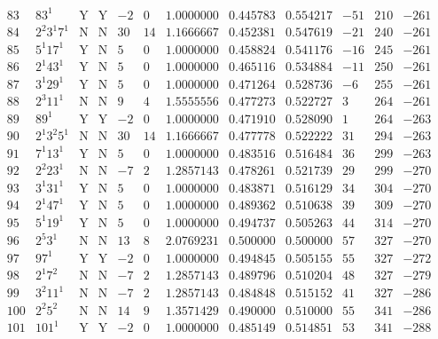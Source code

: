 \documentclass[11pt,reqno,a4letter]{article}
\numberwithin{figure}{section}
\numberwithin{table}{section}
\theoremstyle{plain}
\numberwithin{theorem}{section}
\theoremstyle{definition}
\begin{document}
\begin{table}[h!]
\begin{equation*}
{\begin{array}{cc|cc|ccc|cc|ccc}
 83 & 83^1 & \text{Y} & \text{Y} & -2 & 0 & 1.0000000 & 0.445783 & 0.554217 & -51 & 210 & -261 \\
 84 & 2^2 3^1 7^1 & \text{N} & \text{N} & 30 & 14 & 1.1666667 & 0.452381 & 0.547619 & -21 & 240 & -261 \\
 85 & 5^1 17^1 & \text{Y} & \text{N} & 5 & 0 & 1.0000000 & 0.458824 & 0.541176 & -16 & 245 & -261 \\
 86 & 2^1 43^1 & \text{Y} & \text{N} & 5 & 0 & 1.0000000 & 0.465116 & 0.534884 & -11 & 250 & -261 \\
 87 & 3^1 29^1 & \text{Y} & \text{N} & 5 & 0 & 1.0000000 & 0.471264 & 0.528736 & -6 & 255 & -261 \\
 88 & 2^3 11^1 & \text{N} & \text{N} & 9 & 4 & 1.5555556 & 0.477273 & 0.522727 & 3 & 264 & -261 \\
 89 & 89^1 & \text{Y} & \text{Y} & -2 & 0 & 1.0000000 & 0.471910 & 0.528090 & 1 & 264 & -263 \\
 90 & 2^1 3^2 5^1 & \text{N} & \text{N} & 30 & 14 & 1.1666667 & 0.477778 & 0.522222 & 31 & 294 & -263 \\
 91 & 7^1 13^1 & \text{Y} & \text{N} & 5 & 0 & 1.0000000 & 0.483516 & 0.516484 & 36 & 299 & -263 \\
 92 & 2^2 23^1 & \text{N} & \text{N} & -7 & 2 & 1.2857143 & 0.478261 & 0.521739 & 29 & 299 & -270 \\
 93 & 3^1 31^1 & \text{Y} & \text{N} & 5 & 0 & 1.0000000 & 0.483871 & 0.516129 & 34 & 304 & -270 \\
 94 & 2^1 47^1 & \text{Y} & \text{N} & 5 & 0 & 1.0000000 & 0.489362 & 0.510638 & 39 & 309 & -270 \\
 95 & 5^1 19^1 & \text{Y} & \text{N} & 5 & 0 & 1.0000000 & 0.494737 & 0.505263 & 44 & 314 & -270 \\
 96 & 2^5 3^1 & \text{N} & \text{N} & 13 & 8 & 2.0769231 & 0.500000 & 0.500000 & 57 & 327 & -270 \\
 97 & 97^1 & \text{Y} & \text{Y} & -2 & 0 & 1.0000000 & 0.494845 & 0.505155 & 55 & 327 & -272 \\
 98 & 2^1 7^2 & \text{N} & \text{N} & -7 & 2 & 1.2857143 & 0.489796 & 0.510204 & 48 & 327 & -279 \\
 99 & 3^2 11^1 & \text{N} & \text{N} & -7 & 2 & 1.2857143 & 0.484848 & 0.515152 & 41 & 327 & -286 \\
 100 & 2^2 5^2 & \text{N} & \text{N} & 14 & 9 & 1.3571429 & 0.490000 & 0.510000 & 55 & 341 & -286 \\
 101 & 101^1 & \text{Y} & \text{Y} & -2 & 0 & 1.0000000 & 0.485149 & 0.514851 & 53 & 341 & -288 \\

\end{array}}
\end{equation*}
\end{table}
\end{document}
